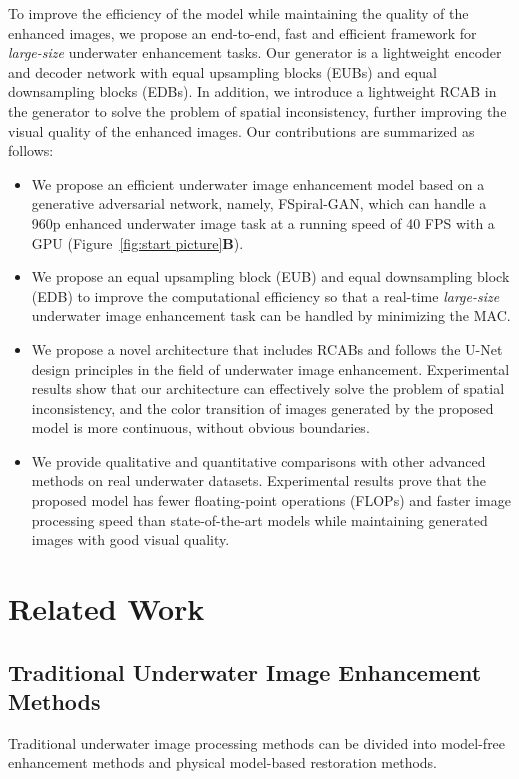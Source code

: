 \documentclass[utf8]{FrontiersinHarvard} %
\begin{document}
To improve the efficiency of the model while maintaining the quality of the enhanced images, we propose an end-to-end, fast and efficient framework for \textit{large-size} underwater enhancement tasks. Our generator is a lightweight encoder and decoder network with equal upsampling blocks (EUBs) and equal downsampling blocks (EDBs). In addition, we introduce a lightweight RCAB in the generator to solve the problem of spatial inconsistency, further improving the visual quality of the enhanced images. Our contributions are summarized as follows:
\begin{itemize}
\item We propose an efficient underwater image enhancement model based on a generative adversarial network, namely, FSpiral-GAN, which can handle a 960p enhanced underwater image task at a running speed of 40 FPS with a GPU (Figure~\ref{fig:start picture}\textbf{B}).

\item 
We propose an equal upsampling block (EUB) and equal downsampling block (EDB) to improve the computational efficiency so that a real-time \textit{large-size} underwater image enhancement task can be handled by minimizing the MAC.


\item We propose a novel architecture that includes RCABs and follows the U-Net design principles in the field of underwater image enhancement. Experimental results show that our architecture can effectively solve the problem of spatial inconsistency, and the color transition of images generated by the proposed model is more continuous, without obvious boundaries.

\item We provide qualitative and quantitative comparisons with other advanced methods on real underwater datasets. Experimental results prove that the proposed model has fewer floating-point operations (FLOPs) and faster image processing speed than state-of-the-art models while maintaining generated images with good visual quality.
\end{itemize}

\section{Related Work}
\subsection{Traditional Underwater Image Enhancement Methods}
Traditional underwater image processing methods can be divided into model-free enhancement methods and physical model-based restoration methods. 
\end{document}
